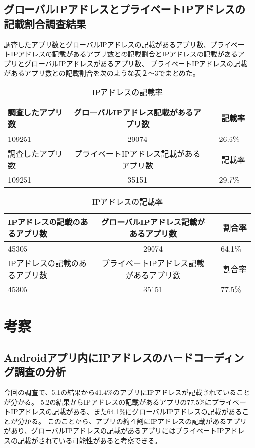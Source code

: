 \documentclass[a4j]{jarticle}
\begin{document}
\newpage

\subsection{グローバルIPアドレスとプライベートIPアドレスの記載割合調査結果}

調査したアプリ数とグローバルIPアドレスの記載があるアプリ数、プライベートIPアドレスの記載があるアプリ数との記載割合とIPアドレスの記載があるアプリとグローバルIPアドレスがあるアプリ数、
プライベートIPアドレスの記載があるアプリ数との記載割合を次のような表２〜3でまとめた。
\begin{table}[htb]
  \begin{center}
    \caption{IPアドレスの記載率}
    \begin{tabular}{|l|c|c|} \hline
      調査したアプリ数 & グローバルIPアドレス記載があるアプリ数 &　記載率　\\ \hline 
109251 & 29074&  26.6\%\\ \hline
調査したアプリ数 & プライベートIPアドレス記載があるアプリ数 &　記載率　\\ \hline 
109251 & 35151 &  29.7\%\\ \hline
    \end{tabular}
    \label{tab:price}
  \end{center}
\end{table}

\begin{table}[htb]
  \begin{center}
    \caption{IPアドレスの記載率}
    \begin{tabular}{|l|c|c|} \hline
IPアドレスの記載のあるアプリ数 & グローバルIPアドレス記載があるアプリ数 &　割合率　\\ \hline 
45305 & 29074 &  64.1\%\\ \hline
IPアドレスの記載のあるアプリ数 & プライベートIPアドレス記載があるアプリ数 &　割合率　\\ \hline 
45305 & 35151 &  77.5\%\\ \hline
    \end{tabular}
    \label{tab:price}
  \end{center}
\end{table}

\newpage
\section{考察}
\subsection{Androidアプリ内にIPアドレスのハードコーディング調査の分析}
今回の調査で、5.1の結果から41.4\%のアプリにIPアドレスが記載されていることが分かる。
5.2の結果からIPアドレスの記載があるアプリの77.5\%にプライベートIPアドレスの記載がある、また64.1\%にグローバルIPアドレスの記載があることが分かる。
このことから、アプリの約４割にIPアドレスの記載があるアプリがあり、グローバルIPアドレスの記載があるアプリにはプライベートIPアドレスの記載がされている可能性があると考察できる。
\end{document}
